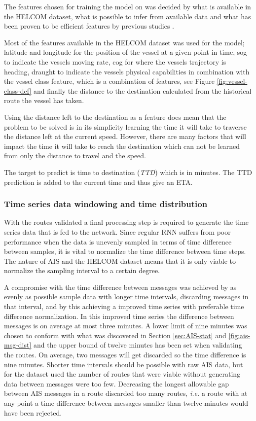 \documentclass[../main.tex]{subfiles}
\begin{document}
The features chosen for training the model on was decided by what is available in the HELCOM dataset, what is possible to infer from available data and what has been proven to be efficient features by previous studies \cite{El_2020, Jahn_2018}.

Most of the features available in the HELCOM dataset was used for the model; latitude and longitude for the position of the vessel at a given point in time, sog to indicate the vessels moving rate, cog for where the vessels trajectory is heading, draught to indicate the vessels physical capabilities in combination with the vessel class feature, which is a combination of features, see Figure \ref{fig:vessel-class-def} and finally the distance to the destination calculated from the historical route the vessel has taken.

Using the distance left to the destination as a feature does mean that the problem to be solved is in its simplicity learning the time it will take to traverse the distance left at the current speed. However, there are many factors that will impact the time it will take to reach the destination which can not be learned from only the distance to travel and the speed. 

The target to predict is time to destination (\textit{TTD}) which is in minutes. The TTD prediction is added to the current time and thus give an ETA.

\subsubsection{Time series data windowing and time distribution}
\label{sec:timeseries}

With the routes validated a final processing step is required to generate the time series data that is fed to the network. Since regular RNN suffers from poor performance when the data is unevenly sampled in terms of time difference between samples, it is vital to normalize the time difference between time steps. The nature of AIS and the HELCOM dataset means that it is only viable to normalize the sampling interval to a certain degree.

A compromise with the time difference between messages was achieved by as evenly as possible sample data with longer time intervals, discarding messages in that interval, and by this achieving a improved time series with preferable time difference normalization. In this improved time series the difference between messages is on average at most three minutes. A lower limit of nine minutes was chosen to conform with what was discovered in Section \ref{sec:AIS-stat} and \ref{fig:ais-msg-dist} and the upper bound of twelve minutes has been set when validating the routes. On average, two messages will get discarded so the time difference is nine minutes. Shorter time intervals should be possible with raw AIS data, but for the dataset used the number of routes that were viable without generating data between messages were too few. Decreasing the longest allowable gap between AIS messages in a route discarded too many routes, \textit{i.e.} a route with at any point a time difference between messages smaller than twelve minutes would have been rejected.
\end{document}

